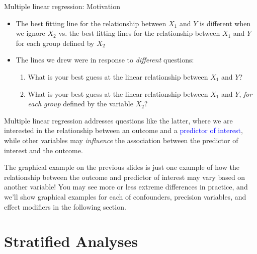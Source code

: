 \documentclass[10pt,t]{beamer}
\begin{document}
\begin{frame}{Multiple linear regression: Motivation}
\begin{itemize}
	\item The best fitting line for the relationship between $X_1$ and $Y$ is different when we ignore $X_2$ vs. the best fitting lines for the relationship between $X_1$ and $Y$ for each group defined by $X_2$
	\item The lines we drew were in response to \textit{different} questions:
	\begin{enumerate}
		\item What is your best guess at the linear relationship between $X_1$ and $Y$?
		\item What is your best guess at the linear relationship between $X_1$ and $Y$, \textit{for each group} defined by the variable $X_2$? 
	\end{enumerate}
\end{itemize}

\vspace{0.3cm}

Multiple linear regression addresses questions like the latter, where we are interested in the relationship between an outcome and a \textcolor{blue}{predictor of interest}, while other variables may \textit{influence} the association between the predictor of interest and the outcome. \pause

\vspace{0.3cm}

\small *The graphical example on the previous slides is just one example of how the relationship between the outcome and predictor of interest may vary based on another variable! You may see more or less extreme differences in practice, and we'll show graphical examples for each of confounders, precision variables, and effect modifiers in the following section.
\end{frame}

\section{Stratified Analyses}
\end{document}
